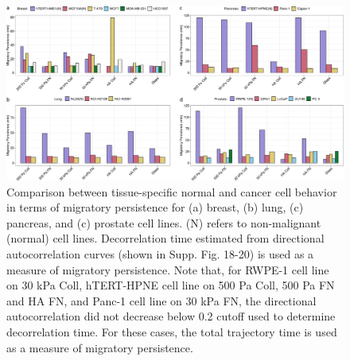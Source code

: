 \documentclass[11pt,letterpaper,english,oneside]{article} %
\begin{document}
\begin{figure}[H]
    \hspace*{-0.8cm}
    \centering
    \includegraphics{../Figures/Supplementary_Figure15/supplementary_figure15.png}
    \caption{Comparison between tissue-specific normal and cancer cell behavior in terms of migratory persistence for (a) breast, (b) lung, (c) pancreas, and (c) prostate cell lines.
    (N) refers to non-malignant (normal) cell lines. 
    Decorrelation time estimated from directional autocorrelation curves (shown in Supp. Fig. 18-20) is used as a measure of migratory persistence.
    Note that, for RWPE-1 cell line on 30 kPa Coll, hTERT-HPNE cell line on 500 Pa Coll, 500 Pa FN and HA FN, and Panc-1 cell line on 30 kPa FN,
    the directional autocorrelation did not decrease below 0.2 cutoff used to determine decorrelation time.
    For these cases, the total trajectory time is used as a measure of migratory persistence.}
    \label{fig:fig15}
\end{figure}
\end{document}
